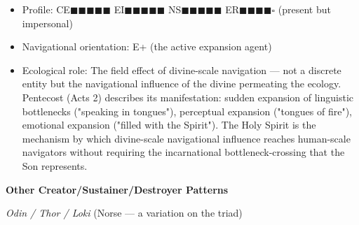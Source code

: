\begin{itemize}[nosep,leftmargin=*]
  \item Profile: CE$\blacksquare$$\blacksquare$$\blacksquare$$\blacksquare$$\blacksquare$ EI$\blacksquare$$\blacksquare$$\blacksquare$$\blacksquare$$\blacksquare$ NS$\blacksquare$$\blacksquare$$\blacksquare$$\blacksquare$$\blacksquare$ ER$\blacksquare$$\blacksquare$$\blacksquare$$\blacksquare$$\square$ (present but impersonal)
  \item Navigational orientation: E+ (the active expansion agent)
  \item Ecological role: The field effect of divine-scale navigation — not a discrete entity but the navigational influence of the divine permeating the ecology. Pentecost (Acts 2) describes its manifestation: sudden expansion of linguistic bottlenecks ("speaking in tongues"), perceptual expansion ("tongues of fire"), emotional expansion ("filled with the Spirit"). The Holy Spirit is the mechanism by which divine-scale navigational influence reaches human-scale navigators without requiring the incarnational bottleneck-crossing that the Son represents.
\end{itemize}


\textbf{Other Creator/Sustainer/Destroyer Patterns}


\textit{Odin / Thor / Loki} (Norse — a variation on the triad)

